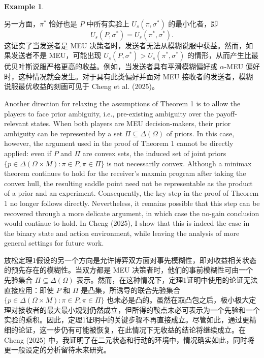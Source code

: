 \documentclass[12pt,a4paper]{article}
\theoremstyle{definition}
\newtheorem{example}{Example}[section]
\theoremstyle{remark}
\newenvironment{original}{%
    \par\medskip\noindent%
    \begin{tcolorbox}[%
        colback=white,%
        colframe=black!50,%
        title=\textbf{Original English},%
        fonttitle=\small\bfseries,%
        left=0pt, right=0pt, top=2pt, bottom=2pt,%
        boxrule=0.5pt,%
        arc=0pt,%
        outer arc=0pt%
    ]%
    \small%
}{%
    \end{tcolorbox}%
}
\newenvironment{translation}{%
    \par\smallskip\noindent%
    \begin{tcolorbox}[%
        colback=blue!3!white,%
        colframe=blue!40!black,%
        title=\textbf{中文翻译},%
        fonttitle=\small\bfseries,%
        left=0pt, right=0pt, top=2pt, bottom=2pt,%
        boxrule=0.5pt,%
        arc=0pt,%
        outer arc=0pt%
    ]%
    \small\color{blue!60!black}%
}{%
    \end{tcolorbox}\medskip%
}
\begin{document}
\begin{example}
\begin{translation}
另一方面，$\pi^*$ 恰好也是 $P$ 中所有实验上 $U_s(\pi, \sigma^*)$ 的最小化者，即
\[
U_s(P, \sigma^*) = U_s(\pi^*, \sigma^*).
\]
这证实了当发送者是 MEU 决策者时，发送者无法从模糊说服中获益。然而，如果发送者不是 MEU，可能出现 $U_s(P, \sigma^*) > U_s(\pi^*, \sigma^*)$ 的情形，从而产生比最优贝叶斯说服严格更高的收益。例如，当发送者具有平滑模糊偏好或 $\alpha$-MEU 偏好时，这种情况就会发生。对于具有此类偏好并面对 MEU 接收者的发送者，模糊说服最优收益的刻画可见于 Cheng et al. (2025)。
\end{translation}
\end{example}

\begin{original}
Another direction for relaxing the assumptions of Theorem 1 is to allow the players to face prior ambiguity, i.e., pre-existing ambiguity over the payoff-relevant states. When both players are MEU decision-makers, their prior ambiguity can be represented by a set $\Pi \subseteq \Delta(\Omega)$ of priors. In this case, however, the argument used in the proof of Theorem 1 cannot be directly applied: even if $P$ and $\Pi$ are convex sets, the induced set of joint priors $\{p \in \Delta(\Omega \times M) : \pi \in P, \pi \in \Pi\}$ is not necessarily convex. Although a minimax theorem continues to hold for the receiver's maxmin program after taking the convex hull, the resulting saddle point need not be representable as the product of a prior and an experiment. Consequently, the key step in the proof of Theorem 1 no longer follows directly. Nevertheless, it remains possible that this step can be recovered through a more delicate argument, in which case the no-gain conclusion would continue to hold. In Cheng (2025), I show that this is indeed the case in the binary state and action environment, while leaving the analysis of more general settings for future work.
\end{original}
\begin{translation}
放松定理1假设的另一个方向是允许博弈双方面对事先模糊性，即对收益相关状态的预先存在的模糊性。当双方都是 MEU 决策者时，他们的事前模糊性可由一个先验集合 $\Pi \subseteq \Delta(\Omega)$ 表示。然而，在这种情况下，定理1证明中使用的论证无法直接应用：即使 $P$ 和 $\Pi$ 是凸集，所诱导的联合先验集合 $\{p \in \Delta(\Omega \times M) : \pi \in P, \pi \in \Pi\}$ 也未必是凸的。虽然在取凸包之后，极小极大定理对接收者的最大最小规划仍然成立，但所得的鞍点未必可表示为一个先验和一个实验的乘积。因此，定理1证明中的关键步骤不再直接成立。尽管如此，通过更精细的论证，这一步仍有可能被恢复，在此情况下无收益的结论将继续成立。在 Cheng (2025) 中，我证明了在二元状态和行动的环境中，情况确实如此，同时将更一般设定的分析留待未来研究。
\end{translation}
\end{document}
